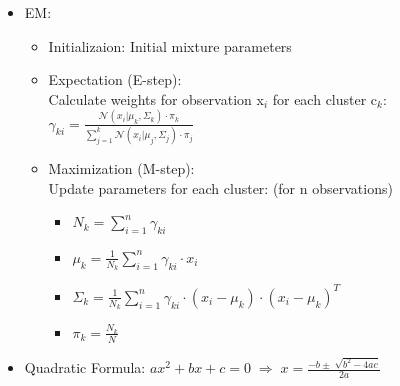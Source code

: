 \documentclass[twocolumn, 10pt]{article}
\begin{document}
\begin{itemize}[leftmargin=*, itemsep=0pt]
    \newpage
    \item EM:
    \begin{itemize}[topsep=0pt, itemsep=0pt]
        \item Initializaion: Initial mixture parameters
        \item Expectation (E-step): \\[2pt]
        Calculate weights for observation x$_i$ for each cluster c$_k$: \\[2pt]
        $\displaystyle \gamma_{ki}=\frac{\mathcal{N}(x_i|\mu_k,\Sigma_k)\cdot\pi_k}{\sum_{j = 1}^{k}\mathcal{N}(x_{i}|\mu_{j},\Sigma_{j})\cdot\pi_{j}}$
        \item Maximization (M-step): \\[2pt]
        Update parameters for each cluster: (for n observations)
        \begin{itemize}[topsep=0pt, itemsep=0pt]
            \item $\displaystyle N_{k}={\sum_{i=1}^{n}\gamma_{ki}}$
            \item $\displaystyle \mu_{k}={\frac{1}{N_{k}}\sum_{i=1}^{n}\gamma_{ki}\cdot x_{i}}$
            \item $\displaystyle \Sigma_{k} = \frac{1}{N_{k}}\sum_{i=1}^{n}\gamma_{ki} \cdot (x_{i} - \mu_{k}) \cdot (x_{i} - \mu_{k})^T$
            \item $\displaystyle \pi_{k}={\frac{N_{k}}{N}}$
        \end{itemize}
    \end{itemize}

    \item Quadratic Formula:
    $\displaystyle ax^2+bx+c=0 \;\Rightarrow\; x=\frac{-b\pm\sqrt[]{b^2-4ac}}{2a}$


\end{itemize}
\end{document}
